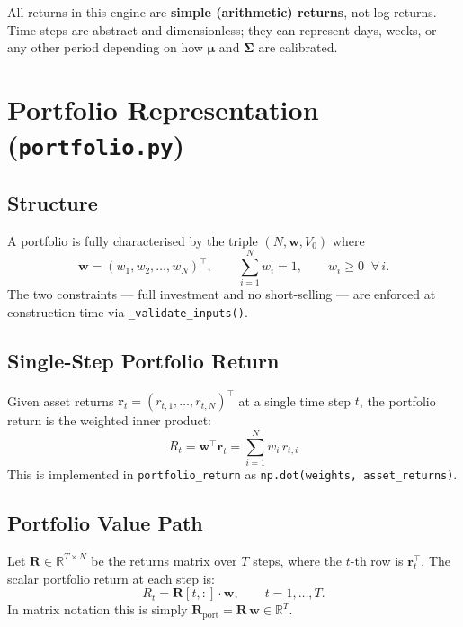 \documentclass[12pt, a4paper]{article}
\begin{document}
All returns in this engine are \textbf{simple (arithmetic) returns}, not
log-returns. Time steps are abstract and dimensionless; they can represent days,
weeks, or any other period depending on how $\bm{\mu}$ and $\bm{\Sigma}$ are
calibrated.

\section{Portfolio Representation (\texttt{portfolio.py})}

\subsection{Structure}

A portfolio is fully characterised by the triple $(N, \bm{w}, V_0)$ where
\[
    \bm{w} = (w_1, w_2, \ldots, w_N)^\top, \qquad
    \sum_{i=1}^{N} w_i = 1, \qquad w_i \geq 0 \;\; \forall\, i.
\]
The two constraints --- full investment and no short-selling --- are enforced at
construction time via \texttt{\_validate\_inputs()}.

\subsection{Single-Step Portfolio Return}

Given asset returns $\bm{r}_t = (r_{t,1}, \ldots, r_{t,N})^\top$ at a single
time step $t$, the portfolio return is the weighted inner product:
\begin{equation}
    \boxed{R_t = \bm{w}^\top \bm{r}_t = \sum_{i=1}^{N} w_i \, r_{t,i}}
    \label{eq:portfolio_return}
\end{equation}
This is implemented in \texttt{portfolio\_return} as \texttt{np.dot(weights,
asset\_returns)}.

\subsection{Portfolio Value Path}

Let $\mathbf{R} \in \mathbb{R}^{T \times N}$ be the returns matrix over $T$
steps, where the $t$-th row is $\bm{r}_t^\top$. The scalar portfolio return at
each step is:
\begin{equation}
    R_t = \mathbf{R}[t, :] \cdot \bm{w}, \qquad t = 1, \ldots, T.
\end{equation}
In matrix notation this is simply $\bm{R}_{\text{port}} = \mathbf{R}\,\bm{w}
\in \mathbb{R}^T$.
\end{document}
